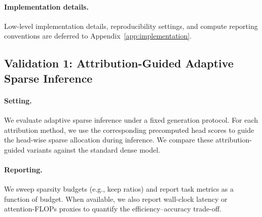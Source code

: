 \paragraph{Implementation details.}
Low-level implementation details, reproducibility settings, and compute reporting conventions are deferred to Appendix~\ref{app:implementation}.

\subsection{Validation 1: Attribution-Guided Adaptive Sparse Inference}
\label{sec:exp:adaptive}

\paragraph{Setting.}
We evaluate adaptive sparse inference under a fixed generation protocol. For each attribution method, we use the corresponding precomputed head scores to guide the head-wise sparse allocation during inference. We compare these attribution-guided variants against the standard dense model.

\paragraph{Reporting.}
We sweep sparsity budgets (e.g., keep ratios) and report task metrics as a function of budget. When available, we also report wall-clock latency or attention-FLOPs proxies to quantify the efficiency--accuracy trade-off.

